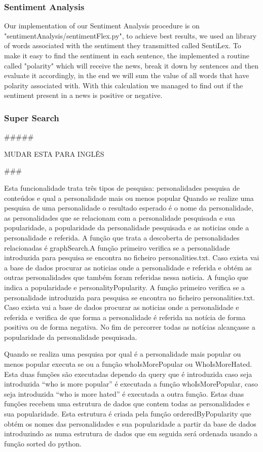 \documentclass{acm_proc_article-sp}
\begin{document}
\subsubsection{Sentiment Analysis}

Our implementation of our Sentiment Analysis procedure is on "sentimentAnalysis/sentimentFlex.py", to achieve best results, we used an library of words associated with the sentiment they transmitted called SentiLex\cite{sent}. 
To make it easy to find the sentiment in each sentence, the implemented a routine called "polarity" which will receive the news, break it down by sentences and then evaluate it accordingly, in the end we will sum the value of all words that have polarity associated with. With this calculation we managed to find out if the sentiment present in a news is positive or negative.

\subsubsection{Super Search}


#####

MUDAR ESTA PARA INGLÊS

###


Esta funcionalidade trata três tipos de pesquisa: personalidades pesquisa de conteúdos e qual a personalidade mais ou menos popular
Quando se realize uma pesquisa de uma personalidade o resultado esperado é o nome da personalidade, as personalidades que se relacionam com a personalidade pesquisada e sua popularidade, a popularidade da personalidade pesquisada e as noticias onde a personalidade e referida.
A função que trata a descoberta de personalidades relacionadas é graphSearch.A função primeiro verifica se a personalidade introduzida para pesquisa se encontra no ficheiro
personalities.txt. Caso exista vai a base de dados procurar as noticias onde a personalidade e referida e obtém as outras personalidades que também foram referidas nessa noticia.
A função que indica a popularidade e personalityPopularity. A função primeiro verifica se a personalidade introduzida para pesquisa se encontra no ficheiro personalities.txt. Caso exista vai a base de dados procurar as noticias onde a personalidade e referida e verifica de que forma a personalidade é referida na notícia de forma positiva ou de forma negativa. No fim de percorrer todas as notícias alcançasse a popularidade da personalidade pesquisada.

Quando se realiza uma pesquisa por qual é a personalidade mais popular ou menos popular executa se ou a função whoIsMorePopular ou WhoIsMoreHated. 
Esta duas funções são executadas dependo da query que é introduzida caso seja introduzida “who is more popular” é executada a função whoIsMorePopular, caso seja introduzida “who is more hated” é executada a outra função. 
Estas duas funções recebem uma estrutura de dados que contem todas as personalidades e sua popularidade. 
Esta estrutura é criada pela função orderedByPopularity que obtém os nomes das personalidades e sua popularidade a partir da base de dados introduzindo as numa estrutura de dados que em seguida será ordenada usando a função sorted do python.
\end{document}
